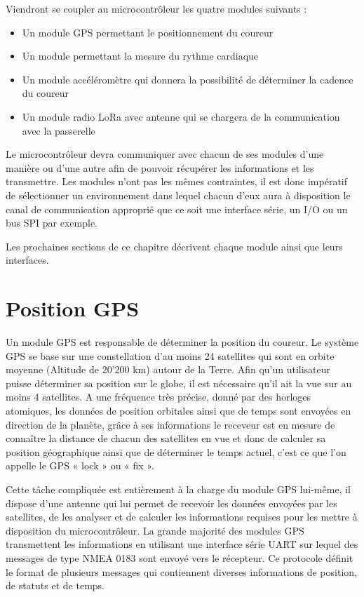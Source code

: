 Viendront se coupler au microcontrôleur les quatre modules suivants :
\begin{itemize}
\item Un module GPS permettant le positionnement du coureur
\item Un module permettant la mesure du rythme cardiaque
\item Un module accéléromètre qui donnera la possibilité de déterminer la cadence du coureur
\item Un module radio LoRa avec antenne qui se chargera de la communication avec la passerelle\\
\end{itemize}

Le microcontrôleur devra communiquer avec chacun de ses modules d’une manière ou d’une autre afin de pouvoir récupérer les informations et les transmettre. Les modules n’ont pas les mêmes contraintes, il est donc impératif de sélectionner un environnement dans lequel chacun d’eux aura à disposition le canal de communication approprié que ce soit une interface série, un I/O ou un bus SPI par exemple.

Les prochaines sections de ce chapitre décrivent chaque module ainsi que leurs interfaces.

\section{Position GPS}

Un module GPS est responsable de déterminer la position du coureur. Le système GPS se base sur une constellation d’au moins 24 satellites qui sont en orbite moyenne (Altitude de 20'200 km) autour de la Terre. Afin qu’un utilisateur puisse déterminer sa position sur le globe, il est nécessaire qu’il ait la vue sur au moins 4 satellites. A une fréquence très précise, donné par des horloges atomiques, les données de position orbitales ainsi que de temps sont envoyées en direction de la planète, grâce à ses informations le receveur est en mesure de connaître la distance de chacun des satellites en vue et donc de calculer sa position géographique ainsi que de déterminer le temps actuel, c’est ce que l’on appelle le GPS « lock » ou « fix ». \cite{gps_overview}

Cette tâche compliquée est entièrement à la charge du module GPS lui-même, il dispose d’une antenne qui lui permet de recevoir les données envoyées par les satellites, de les analyser et de calculer les informations requises pour les mettre à disposition du microcontrôleur.
La grande majorité des modules GPS transmettent les informations en utilisant une interface série UART sur lequel des messages de type NMEA 0183 sont envoyé vers le récepteur. Ce protocole définit le format de plusieurs messages qui contiennent diverses informations de position, de statuts et de temps. \cite{nmea_0183}

